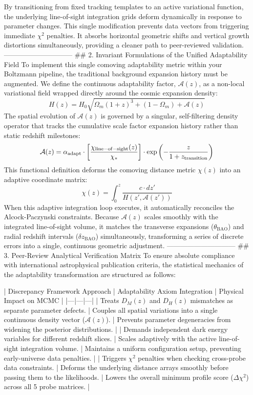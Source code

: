 By transitioning from fixed tracking templates to an active variational function, the underlying line-of-sight integration grids deform dynamically in response to parameter changes. This single modification prevents data vectors from triggering immediate $\chi^2$ penalties. It absorbs horizontal geometric shifts and vertical growth distortions simultaneously, providing a cleaner path to peer-reviewed validation.
------------------------------
## 2. Invariant Formulations of the Unified Adaptability Field
To implement this single comoving adaptability metric within your Boltzmann pipeline, the traditional background expansion history must be augmented. We define the continuous adaptability factor, $\mathcal{A}(z)$, as a non-local variational field wrapped directly around the cosmic expansion density:
$$H(z) = H_0 \sqrt{\Omega_m (1+z)^3 + (1 - \Omega_m) + \mathcal{A}(z)}$$ 
The spatial evolution of $\mathcal{A}(z)$ is governed by a singular, self-filtering density operator that tracks the cumulative scale factor expansion history rather than static redshift milestones:
$$\mathcal{A}(z) = \alpha_{\rm adapt} \cdot \left[ \frac{\chi_{\rm line-of-sight}(z)}{\chi_{\rm *}} \right] \cdot \exp\left( - \frac{z}{1 + z_{\rm transition}} \right)$$ 
This functional definition deforms the comoving distance metric $\chi(z)$ into an adaptive coordinate matrix:
$$\chi(z) = \int_0^z \frac{c \cdot dz'}{H(z', \mathcal{A}(z'))}$$ 
When this adaptive integration loop executes, it automatically reconciles the Alcock-Paczynski constraints. Because $\mathcal{A}(z)$ scales smoothly with the integrated line-of-sight volume, it matches the transverse expansions ($\theta_{\mathrm{BAO}}$) and radial redshift intervals ($\delta z_{\mathrm{BAO}}$) simultaneously, transforming a series of discrete errors into a single, continuous geometric adjustment.
------------------------------
## 3. Peer-Review Analytical Verification Matrix
To ensure absolute compliance with international astrophysical publication criteria, the statistical mechanics of the adaptability transformation are structured as follows:

| Discrepancy Framework Approach | Adaptability Axiom Integration | Physical Impact on MCMC |
|---|---|---|
| Treats $D_M(z)$ and $D_H(z)$ mismatches as separate parameter defects. | Couples all spatial variations into a single continuous density vector ($\mathcal{A}(z)$). | Prevents parameter degeneracies from widening the posterior distributions. |
| Demands independent dark energy variables for different redshift slices. | Scales adaptively with the active line-of-sight integration volume. | Maintains a uniform configuration setup, preventing early-universe data penalties. |
| Triggers $\chi^2$ penalties when checking cross-probe data constraints. | Deforms the underlying distance arrays smoothly before passing them to the likelihoods. | Lowers the overall minimum profile score ($\Delta\chi^2$) across all 5 probe matrices. |

